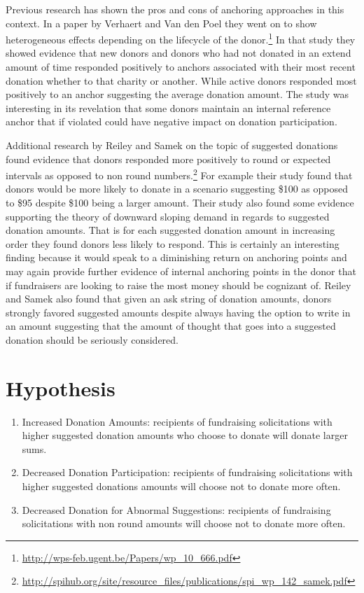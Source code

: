 \documentclass[]{article}
\providecommand{\tightlist}{%
  \setlength{\itemsep}{0pt}\setlength{\parskip}{0pt}}
\let\rmarkdownfootnote\footnote%
\def\footnote{\protect\rmarkdownfootnote}
\begin{document}
Previous research has shown the pros and cons of anchoring approaches in
this context. In a paper by Verhaert and Van den Poel they went on to
show heterogeneous effects depending on the lifecycle of the
donor.\footnote{\url{http://wps-feb.ugent.be/Papers/wp_10_666.pdf}} In
that study they showed evidence that new donors and donors who had not
donated in an extend amount of time responded positively to anchors
associated with their most recent donation whether to that charity or
another. While active donors responded most positively to an anchor
suggesting the average donation amount. The study was interesting in its
revelation that some donors maintain an internal reference anchor that
if violated could have negative impact on donation participation.

Additional research by Reiley and Samek on the topic of suggested
donations found evidence that donors responded more positively to round
or expected intervals as opposed to non round numbers.\footnote{\url{http://spihub.org/site/resource_files/publications/spi_wp_142_samek.pdf}}
For example their study found that donors would be more likely to donate
in a scenario suggesting \$100 as opposed to \$95 despite \$100 being a
larger amount. Their study also found some evidence supporting the
theory of downward sloping demand in regards to suggested donation
amounts. That is for each suggested donation amount in increasing order
they found donors less likely to respond. This is certainly an
interesting finding because it would speak to a diminishing return on
anchoring points and may again provide further evidence of internal
anchoring points in the donor that if fundraisers are looking to raise
the most money should be cognizant of. Reiley and Samek also found that
given an ask string of donation amounts, donors strongly favored
suggested amounts despite always having the option to write in an amount
suggesting that the amount of thought that goes into a suggested
donation should be seriously considered.

\section{Hypothesis}\label{hypothesis}

\begin{enumerate}
\def\labelenumi{\arabic{enumi}.}
\tightlist
\item
  Increased Donation Amounts: recipients of fundraising solicitations
  with higher suggested donation amounts who choose to donate will
  donate larger sums.
\item
  Decreased Donation Participation: recipients of fundraising
  solicitations with higher suggested donations amounts will choose not
  to donate more often.
\item
  Decreased Donation for Abnormal Suggestions: recipients of fundraising
  solicitations with non round amounts will choose not to donate more
  often.
\end{enumerate}
\end{document}
